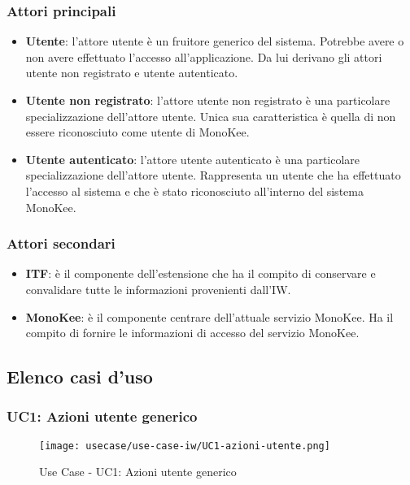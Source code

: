 \subsubsection{Attori principali}
\begin{itemize}
    \item \textbf{Utente}: l’attore utente è un fruitore generico del sistema. Potrebbe avere o non avere effettuato l’accesso all’applicazione. Da lui derivano gli attori utente non registrato e utente autenticato.	
    \item \textbf{Utente non registrato}: l’attore utente non registrato è una particolare specializzazione dell’attore utente. Unica sua caratteristica è quella di non essere riconosciuto come utente di MonoKee.
    \item \textbf{Utente autenticato}: l’attore utente autenticato è una particolare specializzazione dell’attore utente. Rappresenta un utente che ha effettuato l’accesso al sistema e che è stato riconosciuto all’interno del sistema MonoKee.
\end{itemize}
      
\subsubsection{Attori secondari}
\begin{itemize}
    \item \textbf{ITF}: è il componente dell’estensione che ha il compito di conservare e convalidare tutte le informazioni provenienti dall’IW.
    \item \textbf{MonoKee}: è il componente centrare dell’attuale servizio MonoKee. Ha il compito di fornire le informazioni di accesso del servizio MonoKee. 
\end{itemize}
    


\subsection{Elenco casi d'uso}


\subsubsection{UC1: Azioni utente generico}
\begin{figure}[!htbp] 
    \centering 
    \texttt{[image: usecase/use-case-iw/UC1-azioni-utente.png]} 
    \caption{Use Case - UC1: Azioni utente generico}
\end{figure}

